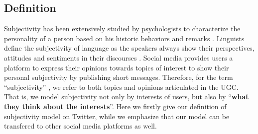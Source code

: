 \documentclass[twocolumn]{svjour3}          %
\begin{document}
\subsection{Definition}
\label{definition}

Subjectivity has been extensively studied by psychologists to characterize the personality of a person based on his historic behaviors and remarks \cite{Engbert2007}. 
Linguists define the subjectivity of language as the speakers always show their perspectives, attitudes and sentiments in their discourses \cite{stein2005subjectivity}. 
Social media provides users a platform to express their opinions towards topics of interest to show their personal subjectivity by publishing short messages. 
Therefore, for the term ``subjectivity'' , we refer to both topics and opinions articulated in the UGC. That is, we model subjectivity not only by interests of users, but also by ``\textbf{what they think about the interests}''.
Here we firstly give our definition of subjectivity model  on Twitter, while we emphasize that our model can be transfered to other social media platforms as well.
\end{document}
